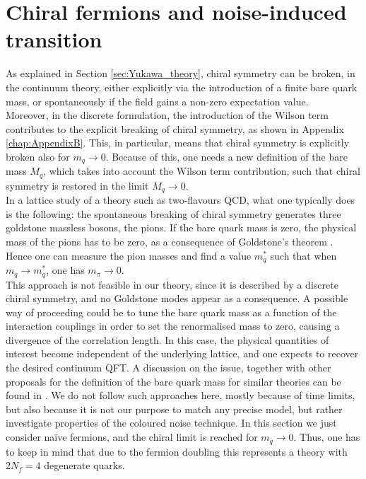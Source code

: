 \section{Chiral fermions and noise-induced transition}
\label{sec:chiral_PT}
As explained in Section \ref{sec:Yukawa_theory}, chiral symmetry can be broken, in the continuum theory, either explicitly via the introduction of a finite bare quark mass, or spontaneously if the field gains a non-zero expectation value.\\
Moreover, in the discrete formulation, the introduction of the Wilson term contributes to the explicit breaking of chiral symmetry, as shown in Appendix \ref{chap:AppendixB}. This, in particular, means that chiral symmetry is explicitly broken also for $m_q \to 0$. Because of this, one needs a new definition of the bare mass $M_q$, which takes into account the Wilson term contribution, such that chiral symmetry is restored in the limit $M_q \to 0$. \\
In a lattice study of a theory such as  two-flavours QCD, what one typically does \cite{rothe_LGT,gattringer_LQCD} is the following: the spontaneous breaking of chiral symmetry generates three goldstone massless bosons, the pions. If the bare quark mass is zero, the physical mass of the pions has to be zero, as a consequence of Goldstone's theorem \cite{goldstone}. Hence one can measure the pion masses and find a value $m_q^*$ such that when $m_q \to m_q^*$, one has $m_\pi \to 0$. \\
This approach is not feasible in our theory, since it is described by a discrete chiral symmetry, and no Goldstone modes appear as a consequence. A possible way of proceeding \cite{Bermudez2018} could be to tune the bare quark mass as a function of the interaction couplings in order to set the renormalised mass to zero, causing a divergence of the correlation length. In this case, the physical quantities of interest become independent of
the underlying lattice, and one expects to recover the desired continuum QFT. A discussion on the issue, together with other proposals for the definition of the bare quark mass for similar theories can be found in \cite{Iwasaki:1994gq,MAIANI1986265}. We do not follow such approaches here, mostly because of time limits, but also because it is not our purpose to match any precise model, but rather investigate properties of the coloured noise technique. In this section we just consider na\"ive fermions, and the chiral limit is reached for $m_q \to 0$. Thus, one has to keep in mind that due to the fermion doubling this represents a theory with $2N_f = 4$ degenerate quarks.
